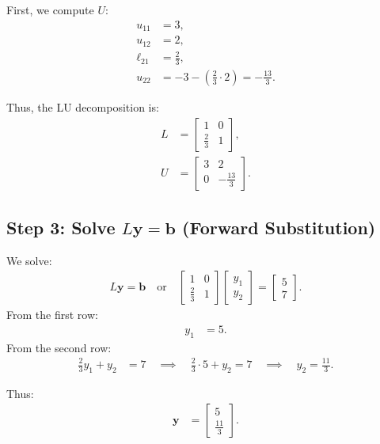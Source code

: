 \documentclass[journal]{IEEEtran}
\begin{document}
	First, we compute $U$:
	\begin{align}
		u_{11} &= 3, \\
		u_{12} &= 2, \\
		\ell_{21} &= \frac{2}{3}, \\
		u_{22} &= -3 - \left(\frac{2}{3} \cdot 2\right) = -\frac{13}{3}.
	\end{align}
	
	Thus, the LU decomposition is:
	\begin{align}
		L &= \begin{bmatrix} 1 & 0 \\ \frac{2}{3} & 1 \end{bmatrix}, \\
		U &= \begin{bmatrix} 3 & 2 \\ 0 & -\frac{13}{3} \end{bmatrix}.
	\end{align}
	
	\subsection*{Step 3: Solve $L\mathbf{y} = \mathbf{b}$ (Forward Substitution)}
	We solve:
	\begin{align}
		L\mathbf{y} = \mathbf{b} \quad \text{or} \quad \begin{bmatrix} 1 & 0 \\ \frac{2}{3} & 1 \end{bmatrix} \begin{bmatrix} y_1 \\ y_2 \end{bmatrix} = \begin{bmatrix} 5 \\ 7 \end{bmatrix}.
	\end{align}
	From the first row:
	\begin{align}
		y_1 &= 5.
	\end{align}
	From the second row:
	\begin{align}
		\frac{2}{3} y_1 + y_2 &= 7 \quad \implies \quad \frac{2}{3} \cdot 5 + y_2 = 7 \quad \implies \quad y_2 = \frac{11}{3}.
	\end{align}
	
	Thus:
	\begin{align}
		\mathbf{y} &= \begin{bmatrix} 5 \\ \frac{11}{3} \end{bmatrix}.
	\end{align}
	
\end{document}
